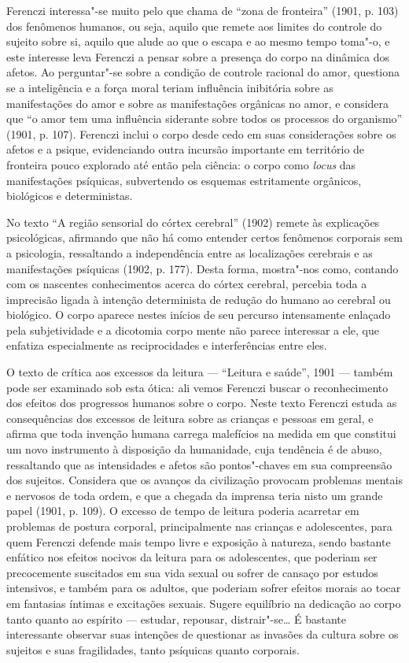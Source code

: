 Ferenczi interessa"-se muito pelo que chama de ``zona de fronteira''
(1901, p. 103) dos fenômenos humanos, ou seja, aquilo que remete aos
limites do controle do sujeito sobre si, aquilo que alude ao que o
escapa e ao mesmo tempo toma"-o, e este interesse leva Ferenczi a pensar
sobre a presença do corpo na dinâmica dos afetos. Ao perguntar"-se sobre
a condição de controle racional do amor, questiona se a inteligência e a
força moral teriam influência inibitória sobre as manifestações do amor
e sobre as manifestações orgânicas no amor, e considera que ``o amor tem
uma influência siderante sobre todos os processos do organismo'' (1901,
p. 107). Ferenczi inclui o corpo desde cedo em suas considerações sobre
os afetos e a psique, evidenciando outra incursão importante em
território de fronteira pouco explorado até então pela ciência: o corpo
como \emph{locus} das manifestações psíquicas, subvertendo os esquemas
estritamente orgânicos, biológicos e deterministas.

No texto ``A região sensorial do córtex cerebral'' (1902) remete às
explicações psicológicas, afirmando que não há como entender certos
fenômenos corporais sem a psicologia, ressaltando a independência entre
as localizações cerebrais e as manifestações psíquicas (1902, p. 177).
Desta forma, mostra"-nos como, contando com os nascentes conhecimentos
acerca do córtex cerebral, percebia toda a imprecisão ligada à intenção
determinista de redução do humano ao cerebral ou biológico. O corpo
aparece nestes inícios de seu percurso intensamente enlaçado pela
subjetividade e a dicotomia corpo  mente não parece interessar a ele,
que enfatiza especialmente as reciprocidades e interferências entre
eles.

O texto de crítica aos excessos da leitura --- ``Leitura e saúde'', 1901 ---
também pode ser examinado sob esta ótica: ali vemos Ferenczi buscar o
reconhecimento dos efeitos dos progressos humanos sobre o corpo. Neste
texto Ferenczi estuda as consequências dos excessos de leitura sobre as
crianças e pessoas em geral, e afirma que toda invenção humana carrega
malefícios na medida em que constitui um novo instrumento à disposição
da humanidade, cuja tendência é de abuso, ressaltando que as
intensidades e afetos são pontos"-chaves em sua compreensão dos sujeitos.
Considera que os avanços da civilização provocam problemas mentais e
nervosos de toda ordem, e que a chegada da imprensa teria nisto um
grande papel (1901, p. 109). O excesso de tempo de
leitura poderia acarretar em problemas de postura corporal,
principalmente nas crianças e adolescentes, para quem Ferenczi defende
mais tempo livre e exposição à natureza, sendo bastante enfático nos
efeitos nocivos da leitura para os adolescentes, que poderiam ser
precocemente suscitados em sua vida sexual ou sofrer de cansaço por
estudos intensivos, e também para os adultos, que poderiam sofrer
efeitos morais ao tocar em fantasias íntimas e excitações sexuais.
Sugere equilíbrio na dedicação ao corpo tanto quanto ao espírito ---
estudar, repousar, distrair"-se\ldots{} É bastante interessante observar suas
intenções de questionar as invasões da cultura sobre os sujeitos e suas
fragilidades, tanto psíquicas quanto corporais.

